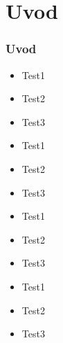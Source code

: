 \section{Uvod}
\begin{frame}[allowframebreaks]
\frametitle{Uvod}
\begin{itemize}
\item Test1
\item Test2
\item Test3
\item Test1
\item Test2
\item Test3
\framebreak
\item Test1
\item Test2
\item Test3
\item Test1
\item Test2
\item Test3
\end{itemize}
\end{frame}